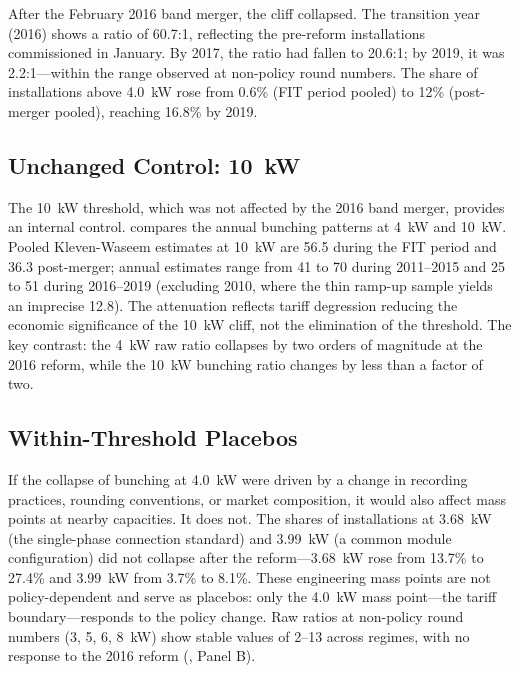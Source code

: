 \documentclass[12pt]{article}
\begin{document}
After the February 2016 band merger, the cliff collapsed. The transition year (2016) shows a ratio of 60.7:1, reflecting the pre-reform installations commissioned in January. By 2017, the ratio had fallen to 20.6:1; by 2019, it was 2.2:1---within the range observed at non-policy round numbers. The share of installations above 4.0~kW rose from 0.6\% (FIT period pooled) to 12\% (post-merger pooled), reaching 16.8\% by 2019.



\subsection{Unchanged Control: 10~kW}

The 10~kW threshold, which was not affected by the 2016 band merger, provides an internal control.  compares the annual bunching patterns at 4~kW and 10~kW. Pooled Kleven-Waseem estimates at 10~kW are 56.5 during the FIT period and 36.3 post-merger; annual estimates range from 41 to 70 during 2011--2015 and 25 to 51 during 2016--2019 (excluding 2010, where the thin ramp-up sample yields an imprecise 12.8). The attenuation reflects tariff degression reducing the economic significance of the 10~kW cliff, not the elimination of the threshold. The key contrast: the 4~kW raw ratio collapses by two orders of magnitude at the 2016 reform, while the 10~kW bunching ratio changes by less than a factor of two.



\subsection{Within-Threshold Placebos}

If the collapse of bunching at 4.0~kW were driven by a change in recording practices, rounding conventions, or market composition, it would also affect mass points at nearby capacities. It does not. The shares of installations at 3.68~kW (the single-phase connection standard) and 3.99~kW (a common module configuration) did not collapse after the reform---3.68~kW rose from 13.7\% to 27.4\% and 3.99~kW from 3.7\% to 8.1\%. These engineering mass points are not policy-dependent and serve as placebos: only the 4.0~kW mass point---the tariff boundary---responds to the policy change. Raw ratios at non-policy round numbers (3, 5, 6, 8~kW) show stable values of 2--13 across regimes, with no response to the 2016 reform (, Panel B).
\end{document}
